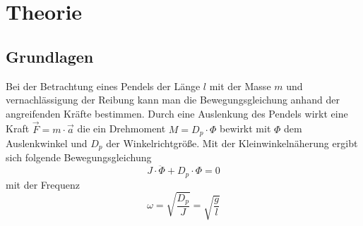 \section{Theorie}
\label{sec:theorie}
\subsection{Grundlagen}
Bei der Betrachtung eines Pendels der Länge $l$ mit der Masse $m$ und vernachlässigung der Reibung kann man die Bewegungsgleichung anhand der angreifenden Kräfte bestimmen.
Durch eine Auslenkung des Pendels wirkt eine Kraft $\vec{F} = m\cdot \vec{a}$ die ein Drehmoment    $ M = D_p \cdot \Phi$
bewirkt mit $\Phi$ dem Auslenkwinkel und $D_p$ der Winkelrichtgröße.
Mit der Kleinwinkelnäherung ergibt sich folgende Bewegungsgleichung 
\begin{equation}
    J\cdot \ddot{\Phi} + D_p \cdot \Phi = 0
\end{equation}
mit der Frequenz 
\begin{equation}
    \omega = \sqrt{\frac{D_p}{J}}=\sqrt{\frac{g}{l}}
\end{equation}
